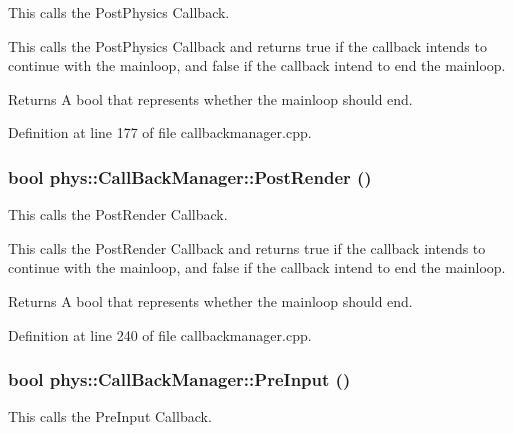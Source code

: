 This calls the PostPhysics Callback. 

This calls the PostPhysics Callback and returns true if the callback intends to continue with the mainloop, and false if the callback intend to end the mainloop. \begin{DoxyReturn}{Returns}
A bool that represents whether the mainloop should end. 
\end{DoxyReturn}


Definition at line 177 of file callbackmanager.cpp.

\hypertarget{classphys_1_1CallBackManager_aa1a1132e877d989ecea08a16ee4b3ac1}{
\subsubsection[{PostRender}]{\setlength{\rightskip}{0pt plus 5cm}bool phys::CallBackManager::PostRender ()}}
\label{d1/d47/classphys_1_1CallBackManager_aa1a1132e877d989ecea08a16ee4b3ac1}


This calls the PostRender Callback. 

This calls the PostRender Callback and returns true if the callback intends to continue with the mainloop, and false if the callback intend to end the mainloop. \begin{DoxyReturn}{Returns}
A bool that represents whether the mainloop should end. 
\end{DoxyReturn}


Definition at line 240 of file callbackmanager.cpp.

\hypertarget{classphys_1_1CallBackManager_a84e782f8729f49b296691763351ee2b1}{
\subsubsection[{PreInput}]{\setlength{\rightskip}{0pt plus 5cm}bool phys::CallBackManager::PreInput ()}}
\label{d1/d47/classphys_1_1CallBackManager_a84e782f8729f49b296691763351ee2b1}


This calls the PreInput Callback. 

